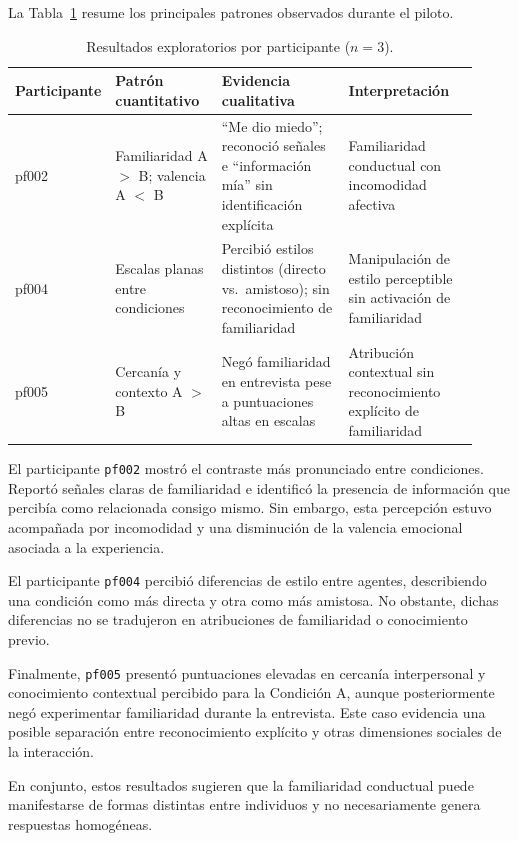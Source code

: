 \documentclass[sigconf, nonacm, language=spanish]{acmart}
\begin{document}
La Tabla~\ref{tab:pilot-cases} resume los principales patrones observados durante el piloto.

\begin{table}[t]
  \caption{Resultados exploratorios por participante ($n=3$).}
  \label{tab:pilot-cases}
  \small
  \begin{tabular}{@{}p{0.08\linewidth} p{0.24\linewidth} p{0.30\linewidth} p{0.30\linewidth}@{}}
    \toprule
    \textbf{Participante} & \textbf{Patrón cuantitativo} & \textbf{Evidencia cualitativa} & \textbf{Interpretación} \\
    \midrule
    pf002 &
    Familiaridad A $>$ B; valencia A $<$ B &
    ``Me dio miedo''; reconoció señales e ``información mía'' sin identificación explícita &
    Familiaridad conductual con incomodidad afectiva \\
    pf004 &
    Escalas planas entre condiciones &
    Percibió estilos distintos (directo vs.\ amistoso); sin reconocimiento de familiaridad &
    Manipulación de estilo perceptible sin activación de familiaridad \\
    pf005 &
    Cercanía y contexto A $>$ B &
    Negó familiaridad en entrevista pese a puntuaciones altas en escalas &
    Atribución contextual sin reconocimiento explícito de familiaridad \\
    \bottomrule
  \end{tabular}
\end{table}

El participante \texttt{pf002} mostró el contraste más pronunciado entre condiciones. Reportó señales claras de familiaridad e identificó la presencia de información que percibía como relacionada consigo mismo. Sin embargo, esta percepción estuvo acompañada por incomodidad y una disminución de la valencia emocional asociada a la experiencia.

El participante \texttt{pf004} percibió diferencias de estilo entre agentes, describiendo una condición como más directa y otra como más amistosa. No obstante, dichas diferencias no se tradujeron en atribuciones de familiaridad o conocimiento previo.

Finalmente, \texttt{pf005} presentó puntuaciones elevadas en cercanía interpersonal y conocimiento contextual percibido para la Condición A, aunque posteriormente negó experimentar familiaridad durante la entrevista. Este caso evidencia una posible separación entre reconocimiento explícito y otras dimensiones sociales de la interacción.

En conjunto, estos resultados sugieren que la familiaridad conductual puede manifestarse de formas distintas entre individuos y no necesariamente genera respuestas homogéneas.
\end{document}
